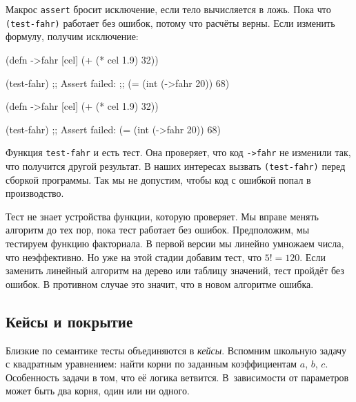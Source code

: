 Макрос \verb|assert| бросит исключение, если тело вычисляется в ложь. Пока что
\verb|(test-fahr)| работает без ошибок, потому что расчёты верны. Если изменить
формулу, получим исключение:

\ifx\devicetype\mobile

\begin{english}
  \begin{clojure}
(defn ->fahr [cel]
  (+ (* cel 1.9) 32))

(test-fahr)
;; Assert failed:
;; (= (int (->fahr 20)) 68)
  \end{clojure}
\end{english}

\else

\begin{english}
  \begin{clojure}
(defn ->fahr [cel]
  (+ (* cel 1.9) 32))

(test-fahr)
;; Assert failed: (= (int (->fahr 20)) 68)
  \end{clojure}
\end{english}

\fi

Функция \verb|test-fahr| и есть тест. Она проверяет, что код \verb|->fahr|
не изменили так, что получится другой результат. В наших интересах вызвать
\verb|(test-fahr)| перед сборкой программы. Так мы не допустим, чтобы код с
ошибкой попал в производство.


Тест не знает устройства функции, которую проверяет. Мы вправе менять алгоритм
до тех пор, пока тест работает без ошибок. Предположим, мы тестируем функцию
факториала. В первой версии мы линейно умножаем числа, что неэффективно. Но уже
на этой стадии добавим тест, что $5! = 120$. Если заменить линейный алгоритм на
дерево или таблицу значений, тест пройдёт без ошибок. В противном случае это
значит, что в новом алгоритме ошибка.

\subsection{Кейсы и покрытие}


Близкие по семантике тесты объединяются в \emph{кейсы}. Вспомним школьную задачу
с квадратным уравнением: найти корни по заданным коэффициентам $a$, $b$,
$c$. Особенность задачи в том, что её логика ветвится. В~зависимости от
параметров может быть два корня, один или ни одного.

